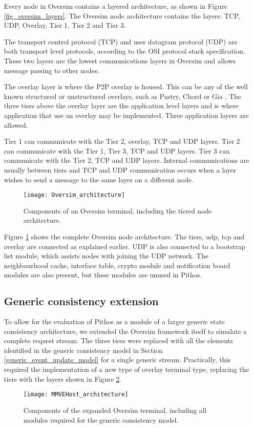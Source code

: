 Every node in Oversim contains a layered architecture, as shown in Figure \ref{fig_oversim_layers}. The Oversim node architecture contains the layers: TCP, UDP, Overlay, Tier 1, Tier 2 and Tier 3.

The transport control protocol (TCP) and user datagram protocol (UDP) are both transport level protocols, according to the OSI protocol stack specification. These two layers are the lowest communications layers in Oversim and allows message passing to other nodes.

The overlay layer is where the P2P overlay is housed. This can be any of the well known structured or unstructured overlays, such as Pastry, Chord or Gia \cite{Chawathe_gia}. The three tiers above the overlay layer are the application level layers and is where application that use an overlay may be implemented. Three application layers are allowed.

Tier 1 can communicate with the Tier 2, overlay, TCP and UDP layers. Tier 2 can communicate with the Tier 1, Tier 3, TCP and UDP layers. Tier 3 can communicate with the Tier 2, TCP and UDP layers. Internal communications are usually between tiers and TCP and UDP communication occurs when a layer wishes to send a message to the same layer on a different node.

\begin{figure}[htbp]
 \centering
 \texttt{[image: Oversim\_architecture]}
 \caption{Components of an Oversim terminal, including the tiered node architecture.}
 \label{fig_oversim_architecture}
\end{figure}
%
Figure \ref{fig_oversim_architecture} shows the complete Oversim node architecture. The tiers, udp, tcp and overlay are connected as explained earlier. UDP is also connected to a bootstrap list module, which assists nodes with joining the UDP network. The neighbourhood cache, interface table, crypto module and notification board modules are also present, but these modules are unused in Pithos.

    \subsection{Generic consistency extension}
    \label{generic_consistency_extension}

To allow for the evaluation of Pithos as a module of a larger generic state consistency architecture, we extended the Oversim framework itself to simulate a complete request stream. The three tiers were replaced with all the elements identified in the generic consistency model in Section \ref{generic_event_update_model} for a single generic stream. Practically, this required the implementation of a new type of overlay terminal type, replacing the tiers with the layers shown in Figure \ref{fig_mmvehost_architecture}.
%
\begin{figure}[htbp]
 \centering
 \texttt{[image: MMVEHost\_architecture]}
 \caption{Components of the expanded Oversim terminal, including all modules required for the generic consistency model.}
 \label{fig_mmvehost_architecture}
\end{figure}

